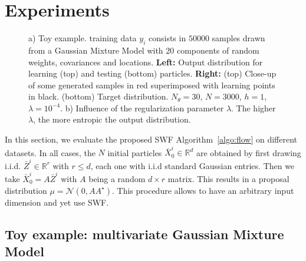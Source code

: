 
\section{Experiments}

\begin{figure}
 \hfill
{}
\caption{a) Toy example. training data $y_i$ consists in $50 000$ samples drawn from a Gaussian Mixture Model with $20$ components of random weights, covariances and locations. \textbf{Left:} Output distribution for learning (top) and testing (bottom) particles. \textbf{Right:} (top) Close-up of some generated samples in red superimposed with learning points in black. (bottom) Target distribution. $N_\theta=30$, $N=3000$, $h=1$, $\lambda=10^{-4}$. b) Influence of the regularization parameter $\lambda$. The higher $\lambda$, the more entropic the output distribution.}
\end{figure}

In this section, we evaluate the proposed SWF Algorithm~\ref{algo:flow} on different datasets. In all cases, the $N$ initial particles $\bar{X}^i_0\in\mathbb{R}^d$ are obtained by first drawing i.i.d. $\bar{Z}^i\in\mathbb{R}^r$ with $r\leq d$, each one with i.i.d standard Gaussian entries. Then we take $\bar{X}^i_0=A\bar{Z}^i$ with $A$ being a random $d\times r$ matrix. This results in a proposal distribution $\mu=\mathcal{N}(0,AA^\star)$. This procedure allows to have an arbitrary input dimension and yet use SWF.

\subsection{Toy example: multivariate Gaussian Mixture Model}
\label{sub:toy_example}

